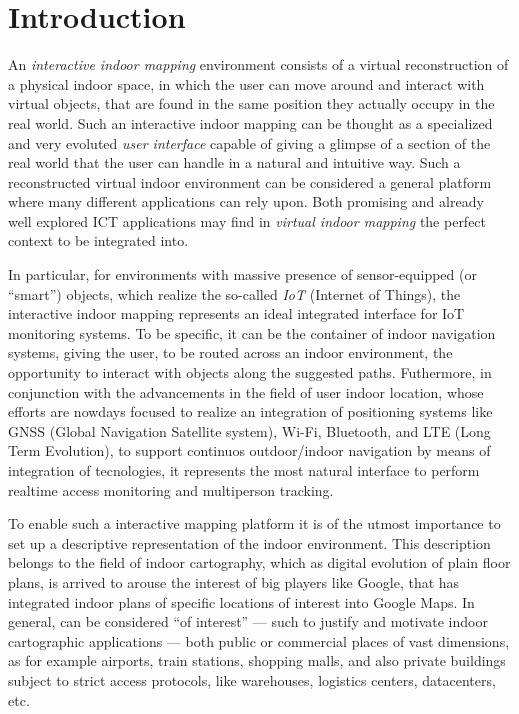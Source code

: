 \section{Introduction}\label{introduction}

An \emph{interactive indoor mapping} environment consists of a virtual reconstruction
of a physical indoor space, in which the user can move around and interact
with virtual objects, that are found in the same position they actually occupy in the
real world. Such an interactive indoor mapping can be thought as a specialized
and very evoluted \emph{user interface} capable of giving a glimpse of a section of
the real world that the user can handle in a natural and intuitive way.  Such
a reconstructed virtual indoor environment can be considered a general
platform where many different applications can rely upon. Both promising and
already well explored ICT applications may find in \emph{virtual indoor mapping} the
perfect context to be integrated into.

In particular, for environments with massive presence of sensor-equipped (or
``smart'') objects, which realize the so-called \emph{IoT} (Internet of
Things), the interactive indoor mapping represents an ideal integrated
interface for IoT monitoring systems. To be specific, it can be the container
of indoor navigation systems, giving the user, to be routed across an indoor
environment, the opportunity to interact with objects along the suggested
paths. Futhermore, in conjunction with the advancements in the field of user
indoor location, whose efforts are nowdays focused to realize an integration
of positioning systems like GNSS (Global Navigation Satellite system), Wi-Fi, Bluetooth, and 
LTE (Long Term Evolution), to support continuos outdoor/indoor navigation by
means of integration of tecnologies,
it represents the most natural interface to perform realtime access monitoring
and multiperson tracking.

To enable such a interactive mapping platform it is of the utmost importance to set up  a
descriptive representation of the indoor environment. This description belongs to 
the field of indoor cartography, which as digital evolution of plain floor
plans, is arrived to arouse the interest of big players like Google, that has
integrated indoor plans of specific locations of interest
\cite{indoormaps}  into Google Maps. In general, can be considered ``of interest'' --- such to
justify and motivate indoor cartographic applications --- both public or
commercial places of vast dimensions, as for example airports, train stations,
shopping malls, and also private buildings subject to strict access protocols,
like warehouses, logistics centers, datacenters, etc.

